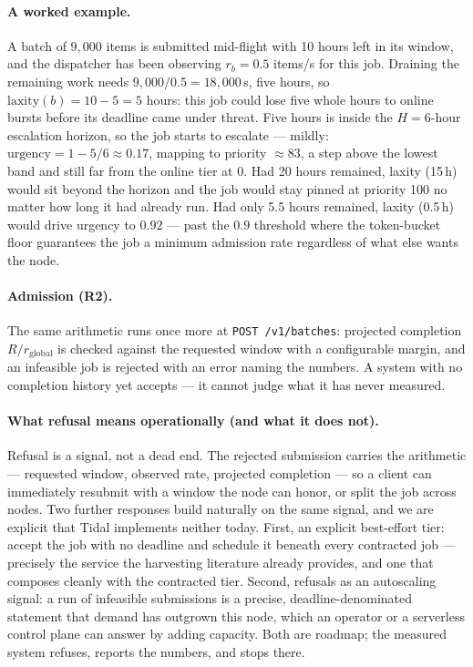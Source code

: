 \documentclass[11pt]{article}
\newcommand{\code}[1]{\texttt{#1}}
\begin{document}
\paragraph{A worked example.} A batch of $9{,}000$ items is submitted mid-flight with
10 hours left in its window, and the dispatcher has been observing $r_b = 0.5$ items/s
for this job. Draining the remaining work needs $9{,}000 / 0.5 = 18{,}000$\,s, five
hours, so $\mathrm{laxity}(b) = 10 - 5 = 5$ hours: this job could lose five whole hours
to online bursts before its deadline came under threat. Five hours is inside the
$H = 6$-hour escalation horizon, so the job starts to escalate --- mildly:
$\mathrm{urgency} = 1 - 5/6 \approx 0.17$, mapping to priority $\approx 83$, a step
above the lowest band and still far from the online tier at 0. Had 20 hours remained,
laxity (15\,h) would sit beyond the horizon and the job would stay pinned at priority
100 no matter how long it had already run. Had only 5.5 hours remained, laxity
(0.5\,h) would drive urgency to $0.92$ --- past the $0.9$ threshold where the
token-bucket floor guarantees the job a minimum admission rate regardless of what else
wants the node.

\paragraph{Admission (R2).} The same arithmetic runs once more at \code{POST
/v1/batches}: projected completion $R/r_{\mathrm{global}}$ is checked against the
requested window with a configurable margin, and an infeasible job is rejected with an
error naming the numbers. A system with no completion history yet accepts --- it cannot
judge what it has never measured.

\paragraph{What refusal means operationally (and what it does not).} Refusal is a
signal, not a dead end. The rejected submission carries the arithmetic --- requested
window, observed rate, projected completion --- so a client can immediately resubmit
with a window the node can honor, or split the job across nodes. Two further responses
build naturally on the same signal, and we are explicit that Tidal implements neither
today. First, an explicit best-effort tier: accept the job with no deadline and
schedule it beneath every contracted job --- precisely the service the harvesting
literature already provides, and one that composes cleanly with the contracted tier.
Second, refusals as an autoscaling signal: a run of infeasible submissions is a
precise, deadline-denominated statement that demand has outgrown this node, which an
operator or a serverless control plane can answer by adding capacity. Both are
roadmap; the measured system refuses, reports the numbers, and stops there.
\end{document}
